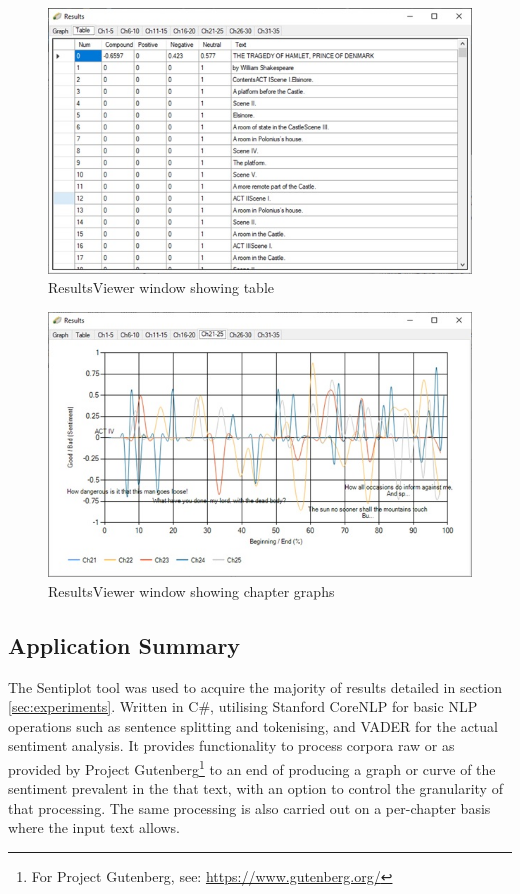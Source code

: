 \documentclass{article}
\begin{document}
{\begin{figure}[htbp]
            \includegraphics[width=1\textwidth]{Figures/Misc/resultstable}
            \caption{ResultsViewer window showing table}
            \label{fig:resultstable}
        \end{figure}
        \begin{figure}[htbp]
            \includegraphics[width=1\textwidth]{Figures/Misc/resultschapters}
            \caption{ResultsViewer window showing chapter graphs}
            \label{fig:resultschapters}
        \end{figure}
    \subsection{Application Summary}
        The Sentiplot tool was used to acquire the majority of results detailed in section \ref{sec:experiments}. Written in C\#, utilising Stanford CoreNLP for basic NLP operations such as sentence splitting and tokenising, and VADER for the actual sentiment analysis. It provides functionality to process corpora raw or as provided by Project Gutenberg\footnote{For Project Gutenberg, see: \url{https://www.gutenberg.org/}} to an end of producing a graph or curve of the sentiment prevalent in the that text, with an option to control the granularity of that processing. The same processing is also carried out on a per-chapter basis where the input text allows.
\newpage
}
\end{document}

